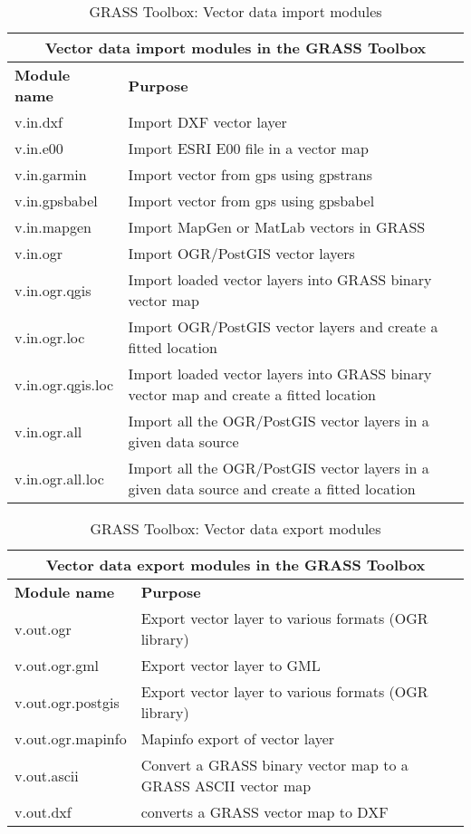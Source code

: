\begin{table}[ht]
\centering
\caption{GRASS Toolbox: Vector data import modules}\medskip
 \begin{tabular}{|p{4cm}|p{12cm}|}
  \hline \multicolumn{2}{|c|}{\textbf{Vector data import modules in the GRASS
Toolbox}} \\
  \hline \textbf{Module name} & \textbf{Purpose} \\
  \hline v.in.dxf & Import DXF vector layer \\
  \hline v.in.e00 & Import ESRI E00 file in a vector map \\
  \hline v.in.garmin & Import vector from gps using gpstrans \\
  \hline v.in.gpsbabel & Import vector from gps using gpsbabel \\
  \hline v.in.mapgen & Import MapGen or MatLab vectors in GRASS \\
  \hline v.in.ogr & Import OGR/PostGIS vector layers \\
  \hline v.in.ogr.qgis & Import loaded vector layers into GRASS binary
  vector map \\
  \hline v.in.ogr.loc & Import OGR/PostGIS vector layers and create a fitted
  location \\
  \hline v.in.ogr.qgis.loc & Import loaded vector layers into GRASS binary
  vector map and create a fitted location \\
  \hline v.in.ogr.all & Import all the OGR/PostGIS vector layers in a given
  data source \\
  \hline v.in.ogr.all.loc & Import all the OGR/PostGIS vector layers in a
  given data source and create a fitted location \\
\hline
\end{tabular}
\end{table}

\begin{table}[ht]
\centering
\caption{GRASS Toolbox: Vector data export modules}\medskip
 \begin{tabular}{|p{4cm}|p{12cm}|}
  \hline \multicolumn{2}{|c|}{\textbf{Vector data export modules in the GRASS
Toolbox}} \\
  \hline \textbf{Module name} & \textbf{Purpose} \\
  \hline v.out.ogr & Export vector layer to various formats (OGR library) \\
  \hline v.out.ogr.gml & Export vector layer to GML \\
  \hline v.out.ogr.postgis & Export vector layer to various formats (OGR
  library) \\
  \hline v.out.ogr.mapinfo & Mapinfo export of vector layer \\
  \hline v.out.ascii & Convert a GRASS binary vector map to a GRASS ASCII
  vector map  \\
  \hline v.out.dxf & converts a GRASS vector map to DXF  \\
\hline
\end{tabular}
\end{table}

